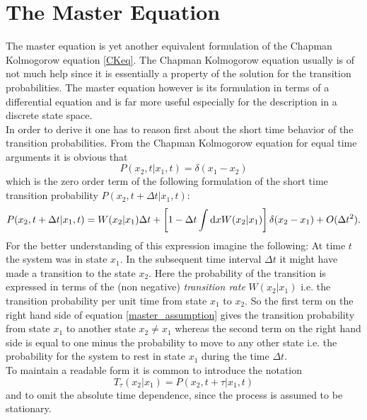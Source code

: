 \section{The Master Equation}
\label{The_Master_Equation}
The master equation is yet another equivalent formulation of the Chapman Kolmogorow equation \eqref{CKeq}. The Chapman Kolmogorow equation usually is of not much help since it is essentially a property of the solution for the transition probabilities. The master equation however is its formulation in terms of a differential equation and is far more useful especially for the description in a discrete state space. \\
In order to derive it one has to reason first about the short time behavior of the transition probabilities. From the Chapman Kolmogorow equation for equal time arguments it is obvious that
\begin{equation}
    P(x_2,t|x_1,t) = \delta(x_1-x_2)
    \label{leading_order}
\end{equation}
which is the zero order term of the following formulation of the short time transition probability $P(x_2,t+\Delta t|x_1,t)$:
\begin{equation}
    P(x_2,t+\Delta t|x_1,t) = W(x_2|x_1)\Delta t + \left[ 1 - \Delta t \int {\rm d} x W(x_2|x_1) \right] \delta(x_2-x_1) + O(\Delta t ^{2}).
    \label{master_assumption}
\end{equation}
For the better understanding of this expression imagine the following: At time $t$ the system was in state $x_1$. In the subsequent time interval $\Delta t$ it might have made a transition to the state $x_2$.
Here the probability of the transition is expressed in terms of the (non negative) {\it transition rate}  $W(x_2|x_1)$ i.e. the transition probability per unit time from state $x_1$ to $x_2$. So the first term on the right hand side of equation \eqref{master_assumption} gives the transition probability from state $x_1$ to another state $x_2 \ne x_1$ whereas the second term on the right hand side is equal to one minus the probability to move to any other state i.e. the probability for the system to rest in state $x_1$ during the time $\Delta t$.\\
To maintain a readable form it is common to introduce the notation
\begin{equation}
    T_\tau (x_2|x_1) = P(x_2,t+\tau|x_1,t)
\end{equation}
and to omit the absolute time dependence, since the process is assumed to be stationary. \\
